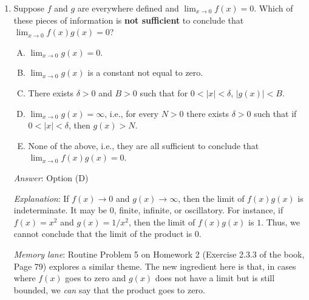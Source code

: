 \documentclass[10pt]{amsart}
\begin{document}
\begin{enumerate}
  {\em Future teaser}: This idea of partitioning an interval into
  sub-intervals by choosing some points keeps coming up. Further, the
  idea of combining two partitions of the same interval into a finer
  partition that refines both of them will also come up. Specifically,
  both these ideas turn up when we try to define the integral of a
  continuous (or piecewise continuous) function on an interval.

  {\em Performance review}: $10$ out of $12$ got this correct. $2$
  chose (E).

  {\em Historical note (last year)}: $9$ out of $11$ people got this
  correct. $1$ person chose (C) and $1$ person chose (E).

  {\em Action point}: Whether or not you got this correct, make sure
  that you {\em now} understand the logic behind it. This idea is
  extremely important in the future.

\item Suppose $f$ and $g$ are everywhere defined and $\lim_{x \to 0}
  f(x) = 0$. Which of these pieces of information is {\bf not
  sufficient} to conclude that $\lim_{x \to 0} f(x)g(x) = 0$?

  \begin{enumerate}[(A)]
  \item $\lim_{x \to 0} g(x) = 0$.
  \item $\lim_{x \to 0} g(x)$ is a constant not equal to zero.
  \item There exists $\delta > 0$ and $B > 0$ such that for $0 < |x| <
    \delta$, $|g(x)| < B$.
  \item $\lim_{x \to 0} g(x) = \infty$, i.e., for every $N > 0$ there
    exists $\delta > 0$ such that if $0 < |x| < \delta$, then $g(x) >
    N$.
  \item None of the above, i.e., they are all sufficient to conclude
    that $\lim_{x \to 0} f(x)g(x) = 0$.
  \end{enumerate}

  {\em Answer}: Option (D)

  {\em Explanation}: If $f(x) \to 0$ and $g(x) \to \infty$, then the
  limit of $f(x)g(x)$ is indeterminate. It may be $0$, finite,
  infinite, or oscillatory. For instance, if $f(x) = x^2$ and $g(x) =
  1/x^2$, then the limit of $f(x)g(x)$ is $1$. Thus, we cannot conclude
  that the limit of the product is $0$.

  {\em Memory lane}: Routine Problem 5 on Homework 2 (Exercise 2.3.3
  of the book, Page 79) explores a similar theme. The new ingredient
  here is that, in cases where $f(x)$ goes to zero and $g(x)$ does not
  have a limit but is still bounded, we {\em can} say that the product
  goes to zero.


\end{enumerate}
\end{document}
